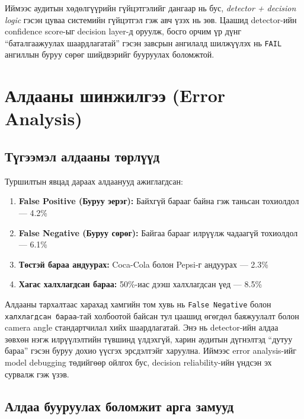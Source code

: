 Иймээс аудитын хөдөлгүүрийн гүйцэтгэлийг дангаар нь бус, \textit{detector + decision logic} гэсэн цуваа системийн гүйцэтгэл гэж авч үзэх нь зөв. Цаашид detector-ийн confidence score-ыг decision layer-д оруулж, босго орчим үр дүнг ``баталгаажуулах шаардлагатай'' гэсэн завсрын ангилалд шилжүүлэх нь \texttt{FAIL} ангиллын буруу сөрөг шийдвэрийг бууруулах боломжтой.

\section{Алдааны шинжилгээ (Error Analysis)}

\subsection{Түгээмэл алдааны төрлүүд}

Туршилтын явцад дараах алдаанууд ажиглагдсан:

\begin{enumerate}
    \item \textbf{False Positive (Буруу эерэг):} Байхгүй барааг байна гэж таньсан тохиолдол --- 4.2\%
    \item \textbf{False Negative (Буруу сөрөг):} Байгаа барааг илрүүлж чадаагүй тохиолдол --- 6.1\%
    \item \textbf{Төстэй бараа андуурах:} Coca-Cola болон Pepsi-г андуурах --- 2.3\%
    \item \textbf{Хагас халхлагдсан бараа:} 50\%-иас дээш халхлагдсан үед --- 8.5\%
\end{enumerate}

Алдааны тархалтаас харахад хамгийн том хувь нь \texttt{False Negative} болон \texttt{халхлагдсан бараа}-тай холбоотой байсан тул цаашид өгөгдөл баяжуулалт болон camera angle стандартчилал хийх шаардлагатай. Энэ нь detector-ийн алдаа зөвхөн нэгж илрүүлэлтийн түвшинд үлдэхгүй, харин аудитын дүгнэлтэд ``дутуу бараа'' гэсэн буруу дохио үүсгэх эрсдэлтэйг харуулна. Иймээс error analysis-ийг model debugging төдийгөөр ойлгох бус, decision reliability-ийн үндсэн эх сурвалж гэж үзэв.

\subsection{Алдаа бууруулах боломжит арга замууд}

